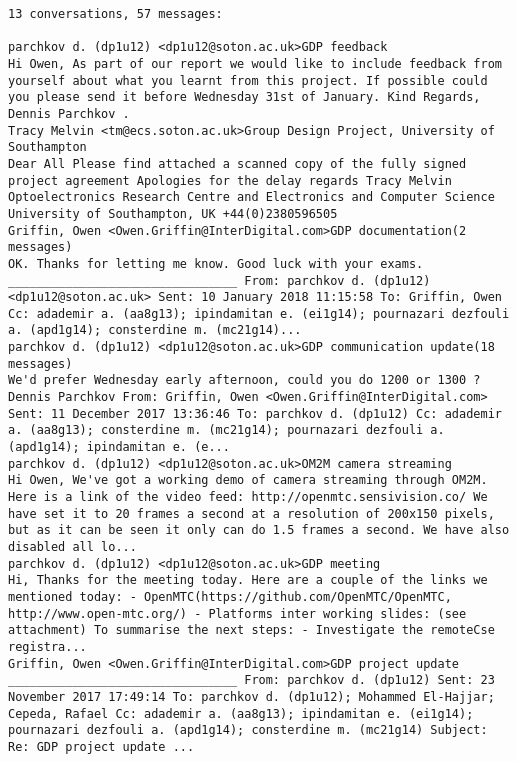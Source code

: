 \begin{lstlisting}
13 conversations, 57 messages:

parchkov d. (dp1u12) <dp1u12@soton.ac.uk>GDP feedback
Hi Owen, As part of our report we would like to include feedback from yourself about what you learnt from this project. If possible could you please send it before Wednesday 31st of January. Kind Regards, Dennis Parchkov .
Tracy Melvin <tm@ecs.soton.ac.uk>Group Design Project, University of Southampton
Dear All Please find attached a scanned copy of the fully signed project agreement Apologies for the delay regards Tracy Melvin Optoelectronics Research Centre and Electronics and Computer Science University of Southampton, UK +44(0)2380596505
Griffin, Owen <Owen.Griffin@InterDigital.com>GDP documentation(2 messages)
OK. Thanks for letting me know. Good luck with your exams. ________________________________ From: parchkov d. (dp1u12) <dp1u12@soton.ac.uk> Sent: 10 January 2018 11:15:58 To: Griffin, Owen Cc: adademir a. (aa8g13); ipindamitan e. (ei1g14); pournazari dezfouli a. (apd1g14); consterdine m. (mc21g14)...
parchkov d. (dp1u12) <dp1u12@soton.ac.uk>GDP communication update(18 messages)
We'd prefer Wednesday early afternoon, could you do 1200 or 1300 ? Dennis Parchkov From: Griffin, Owen <Owen.Griffin@InterDigital.com> Sent: 11 December 2017 13:36:46 To: parchkov d. (dp1u12) Cc: adademir a. (aa8g13); consterdine m. (mc21g14); pournazari dezfouli a. (apd1g14); ipindamitan e. (e...
parchkov d. (dp1u12) <dp1u12@soton.ac.uk>OM2M camera streaming
Hi Owen, We've got a working demo of camera streaming through OM2M. Here is a link of the video feed: http://openmtc.sensivision.co/ We have set it to 20 frames a second at a resolution of 200x150 pixels, but as it can be seen it only can do 1.5 frames a second. We have also disabled all lo...
parchkov d. (dp1u12) <dp1u12@soton.ac.uk>GDP meeting
Hi, Thanks for the meeting today. Here are a couple of the links we mentioned today: - OpenMTC(https://github.com/OpenMTC/OpenMTC, http://www.open-mtc.org/) - Platforms inter working slides: (see attachment) To summarise the next steps: - Investigate the remoteCse registra...
Griffin, Owen <Owen.Griffin@InterDigital.com>GDP project update
________________________________ From: parchkov d. (dp1u12) Sent: 23 November 2017 17:49:14 To: parchkov d. (dp1u12); Mohammed El-Hajjar; Cepeda, Rafael Cc: adademir a. (aa8g13); ipindamitan e. (ei1g14); pournazari dezfouli a. (apd1g14); consterdine m. (mc21g14) Subject: Re: GDP project update ...

\end{lstlisting}
